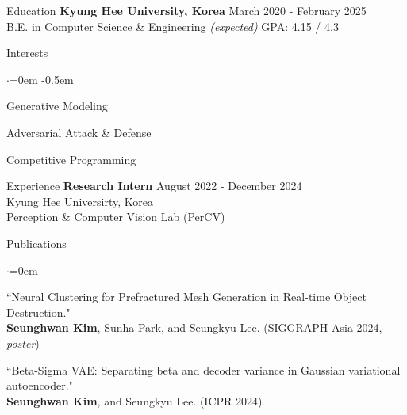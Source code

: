 \documentclass{resume}
\begin{document}
\begin{rSection}{Education}
  {\bf Kyung Hee University, Korea } \hfill {March 2020 - February 2025} \\
  { B.E. in Computer Science \& Engineering {\it(expected)} \hfill GPA: 4.15 / 4.3 }

\end{rSection}

\begin{rSection}{Interests}
  \begin{list}{$\cdot$}{\leftmargin=0em}
    \itemsep -0.5em
    \item Generative Modeling
    \item Adversarial Attack \& Defense
    \item Competitive Programming
  \end{list}
\end{rSection}

\begin{rSection}{Experience}
  {\bf Research Intern } \hfill {August 2022 - December 2024} \\
  { Kyung Hee Universirty, Korea } \\
  { Perception \& Computer Vision Lab (PerCV) }
\end{rSection}

\begin{rSection}{Publications}
  \begin{list}{$\cdot$}{\leftmargin=0em}
    \item ``Neural Clustering for Prefractured Mesh Generation in Real-time Object Destruction." \\ {\bf Seunghwan Kim}, Sunha Park, and Seungkyu Lee. (SIGGRAPH Asia 2024, {\it poster})
    \item ``Beta-Sigma VAE: Separating beta and decoder variance in Gaussian variational autoencoder." \\ {\bf Seunghwan Kim}, and Seungkyu Lee. (ICPR 2024)
  \end{list}
\end{rSection}
\end{document}

